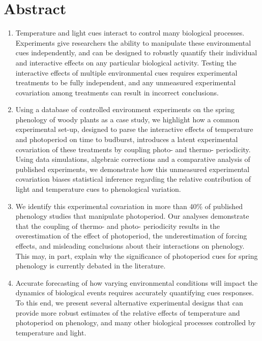 \documentclass[11pt]{article}
\begin{document}
\section*{Abstract}
\begin{enumerate}
\item Temperature and light cues interact to control many biological processes. Experiments give researchers the ability to manipulate these environmental cues independently, and can be designed to robustly quantify their individual and interactive effects on any particular biological activity. Testing the interactive effects of multiple environmental cues requires experimental treatments to be fully independent, and any unmeasured experimental covariation among treatments can result in incorrect conclusions. %

\item  Using a database of controlled environment experiments on the spring phenology of woody plants as a case study, we highlight how a common experimental set-up, designed to parse the interactive effects of temperature and photoperiod on time to budburst, introduces a latent experimental covariation of these treatments by coupling photo- and thermo- periodicity. Using data simulations, algebraic corrections and a comparative analysis of published experiments, we demonstrate how this unmeasured experimental covariation biases statistical inference regarding the relative contribution of light and temperature cues to phenological variation.

\item We identify this experimental covariation in more than 40\% of published phenology studies that manipulate photoperiod. Our analyses demonstrate that the coupling of thermo- and photo- periodicity results in the overestimation of the effect of photoperiod, the underestimation of forcing effects, and misleading conclusions about their interactions on phenology. This may, in part, explain why the significance of photoperiod cues for spring phenology is currently debated in the literature.

\item Accurate forecasting of how varying environmental conditions will impact the dynamics of biological events requires accurately quantifying cues responses. To this end, we present several alternative experimental designs that can provide more robust estimates of the relative effects of temperature and photoperiod on phenology, and many other biological processes controlled by temperature and light.
\end{enumerate}
\end{document}
